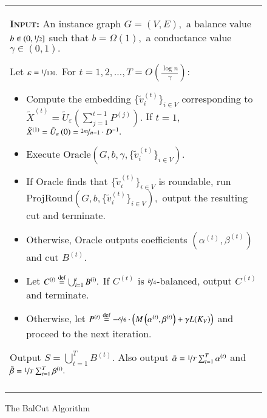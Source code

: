 \documentclass[twoside,leqno,twocolumn]{article}
\newcommand{\nfrac}{\nicefrac}
\newcommand{\defeq}{\stackrel{\textup{def}}{=}}
\newcommand{\e}{\epsilon}
\let\e\varepsilon
\numberwithin{equation}{section}
\newcommand{\alg}{{\sc BalCut}\xspace}
\begin{document}
\begin{figure*}[htb]
  	\begin{tabularx}{\textwidth}{|X|}
    \hline
	 \vspace{1mm}

  {\bf \textsc{Input:}} An instance graph $G=(V,E),$ a balance value $b \in (0, \nfrac{1}{2}]$ such that $b = \Omega(1),$ a conductance value $\gamma \in (0,1).$
	\vspace{1mm}

Let $\e = \nfrac{1}{130} .$ 
	For $t = 1, 2, \ldots, T = O\left(\frac{\log n}{\gamma}\right):
$
	\begin{itemize}
	\item Compute the embedding $\{\tilde{v}^{(t)}_i\}_{i \in V}$ corresponding to $\tilde{X}^{(t)} = \tilde{U}_\e\left(\sum_{j=1}^{t-1} P^{(j)}\right).$ If $t=1,$ $\tilde{X}^{(1)} = \tilde{U}_\e\left(0\right) = \nfrac{2m}{n-1} \cdot D^{-1}.$
   \item Execute {\sc Oracle}$\left(G, b, \gamma, \{\tilde{v}^{(t)}_i\}_{i \in V}\right).$
	
	\item If {\sc Oracle}\xspace finds that $\{\tilde{v}^{(t)}_i\}_{i \in V}$ is roundable, run {\sc ProjRound}$\left(G,b, \{\tilde{v}^{(t)}_i\}_{i \in V}\right),$ output the resulting cut and terminate. 
	\item Otherwise, {\sc Oracle}\xspace outputs coefficients $\left(\alpha^{(t)}, \beta^{(t)}\right)$ and cut $B^{(t)}.$ 
	
	\item Let $C^{(t)} \defeq \bigcup_{i=1}^t B^{(i)}.$ If $C^{(t)}$ is $\nfrac{b}{4}$-balanced, output $C^{(t)}$ and terminate.

	\item Otherwise, let $ P^{(t)} \defeq -\nfrac{\e}{6} \cdot \left(M\left(\alpha^{(t)}, \beta^{(t)}\right) + \gamma L(K_V)\right)$ and proceed to the next iteration.
  \end{itemize}

Output $S = \bigcup_{t=1}^T B^{(t)}.$ Also output  $\bar{\alpha} =\nfrac{1}{T} \sum_{t=1}^T  \alpha^{(t)}$ and $\bar{\beta} = \nfrac{1}{T} \sum_{t=1}^T \beta^{(t)}.$ 
\\
\\
\hline 
\end{tabularx}
  \caption{The \alg Algorithm}
  \label{fig:algorithm}
\end{figure*}
\end{document}

